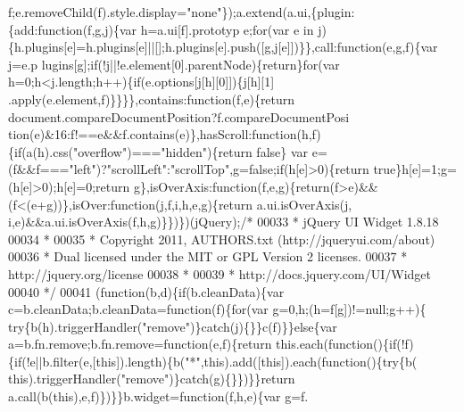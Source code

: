 \begin{DoxyCode}
       f;e.removeChild(f).style.display=\textcolor{stringliteral}{"none"}\});a.extend(a.ui,\{plugin:\{add:function(f,g,j)\{var h=a.ui[f].prototyp
      e;for(var e in j)\{h.plugins[e]=h.plugins[e]||[];h.plugins[e].push([g,j[e]])\}\},call:function(e,g,f)\{var j=e.p
      lugins[g];if(!j||!e.element[0].parentNode)\{return\}for(var h=0;h<j.length;h++)\{if(e.options[j[h][0]])\{j[h][1]
      .apply(e.element,f)\}\}\}\},contains:\textcolor{keyword}{function}(f,e)\{return document.compareDocumentPosition?f.compareDocumentPosi
      tion(e)&16:f!==e&&f.contains(e)\},hasScroll:\textcolor{keyword}{function}(h,f)\{if(a(h).css(\textcolor{stringliteral}{"overflow"})===\textcolor{stringliteral}{"hidden"})\{return false\}
      var e=(f&&f===\textcolor{stringliteral}{"left"})?\textcolor{stringliteral}{"scrollLeft"}:\textcolor{stringliteral}{"scrollTop"},g=\textcolor{keyword}{false};\textcolor{keywordflow}{if}(h[e]>0)\{return true\}h[e]=1;g=(h[e]>0);h[e]=0;\textcolor{keywordflow}{return} 
      g\},isOverAxis:\textcolor{keyword}{function}(f,e,g)\{\textcolor{keywordflow}{return}(f>e)&&(f<(e+g))\},isOver:\textcolor{keyword}{function}(j,f,i,h,e,g)\{\textcolor{keywordflow}{return} a.ui.isOverAxis(j,
      i,e)&&a.ui.isOverAxis(f,h,g)\}\})\})(jQuery);\textcolor{comment}{/*}
00033 \textcolor{comment}{ * jQuery UI Widget 1.8.18}
00034 \textcolor{comment}{ *}
00035 \textcolor{comment}{ * Copyright 2011, AUTHORS.txt (http://jqueryui.com/about)}
00036 \textcolor{comment}{ * Dual licensed under the MIT or GPL Version 2 licenses.}
00037 \textcolor{comment}{ * http://jquery.org/license}
00038 \textcolor{comment}{ *}
00039 \textcolor{comment}{ * http://docs.jquery.com/UI/Widget}
00040 \textcolor{comment}{ */}
00041 (\textcolor{keyword}{function}(b,d)\{\textcolor{keywordflow}{if}(b.cleanData)\{var c=b.cleanData;b.cleanData=\textcolor{keyword}{function}(f)\{\textcolor{keywordflow}{for}(var g=0,h;(h=f[g])!=null;g++)\{\textcolor{keywordflow}{
      try}\{b(h).triggerHandler(\textcolor{stringliteral}{"remove"})\}\textcolor{keywordflow}{catch}(j)\{\}\}c(f)\}\}\textcolor{keywordflow}{else}\{var a=b.fn.remove;b.fn.remove=\textcolor{keyword}{function}(e,f)\{\textcolor{keywordflow}{return} 
      this.each(\textcolor{keyword}{function}()\{\textcolor{keywordflow}{if}(!f)\{\textcolor{keywordflow}{if}(!e||b.filter(e,[\textcolor{keyword}{this}]).length)\{b(\textcolor{stringliteral}{"*"},\textcolor{keyword}{this}).add([\textcolor{keyword}{this}]).each(\textcolor{keyword}{function}()\{\textcolor{keywordflow}{try}\{b(\textcolor{keyword}{
      this}).triggerHandler(\textcolor{stringliteral}{"remove"})\}\textcolor{keywordflow}{catch}(g)\{\}\})\}\}\textcolor{keywordflow}{return} a.call(b(\textcolor{keyword}{this}),e,f)\})\}\}b.widget=\textcolor{keyword}{function}(f,h,e)\{var g=f.

\end{DoxyCode}
